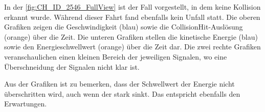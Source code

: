 

In der \autoref{fig:CH_ID_2546_FullView} ist der Fall vorgestellt, in dem keine Kollision erkannt wurde. Während dieser Fahrt fand ebenfalls kein Unfall statt. 
Die oberen Grafiken zeigen die Geschwindigkeit (blau) sowie die CollisionHit-Auslösung (orange) über die Zeit.
Die unteren Grafiken stellen die kinetische Energie (blau) sowie den Energieschwellwert (orange) über die Zeit dar.
Die zwei rechte Grafiken veranschaulichen einen kleinen Bereich der jeweiligen Signalen, wo eine Überschneidung der Signalen nicht klar ist.

Aus der Grafiken ist zu bemerken, dass der Schwellwert der Energie nicht überschritten wird, auch wenn der stark sinkt. Das entspricht ebenfalls den Erwartungen.



